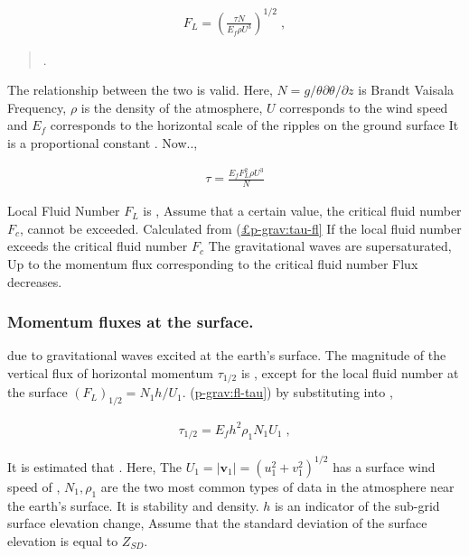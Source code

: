 \begin{eqnarray}
   F_L = \left(
            \frac{\tau N}{E_f \rho U^3}
           \right)^{1/2} \; ,
\end{eqnarray}

\begin{quote}
\protect\hypertarget{p-grav:tau-fl}{}{\fl.}
\end{quote}

The relationship between the two is valid. Here,
\(N = g/\theta \partial \theta/\partial z\) is Brandt Vaisala Frequency,
\(\rho\) is the density of the atmosphere, \(U\) corresponds to the wind
speed and \(E_f\) corresponds to the horizontal scale of the ripples on
the ground surface It is a proportional constant . Now..,

\begin{eqnarray}
  \tau = \frac{E_f F_L^2 \rho U^3}{N}
\end{eqnarray}

\begin{quote}
\protect\hypertarget{p-grav:fl-tau}{}{}
\end{quote}

Local Fluid Number \(F_L\) is , Assume that a certain value, the
critical fluid number \(F_{c}\), cannot be exceeded. Calculated from
(\protect\hyperlink{p-grav:tau-fl}{£p-grav:tau-fl{]}} If the local fluid
number exceeds the critical fluid number \(F_{c}\) The gravitational
waves are supersaturated, Up to the momentum flux corresponding to the
critical fluid number Flux decreases.

\hypertarget{momentum-fluxes-at-the-surface.}{%
\subsubsection{Momentum fluxes at the
surface.}\label{momentum-fluxes-at-the-surface.}}

due to gravitational waves excited at the earth's surface. The magnitude
of the vertical flux of horizontal momentum \(\tau_{1/2}\) is , except
for the local fluid number at the surface \((F_L)_{1/2} = N_1 h/U_1\).
(\protect\hyperlink{p-grav:fl-tau}{p-grav:fl-tau{]}}) by substituting
into ,

\begin{eqnarray}
  \tau_{1/2} = E_f h^2 \rho_1 N_1 U_1 \; ,
\end{eqnarray}

It is estimated that . Here, The
\(U_1 = |{\mathbf v}_1| = (u_1^2 + v_1^2)^{1/2}\) has a surface wind
speed of , \(N_1, \rho_1\) are the two most common types of data in the
atmosphere near the earth's surface. It is stability and density. \(h\)
is an indicator of the sub-grid surface elevation change, Assume that
the standard deviation of the surface elevation is equal to \(Z_{SD}\).

